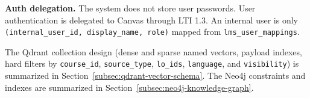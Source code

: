 \textbf{Auth delegation.} The system does not store user passwords. User
authentication is delegated to Canvas through LTI 1.3. An internal user is
only \texttt{(internal\_user\_id, display\_name, role)} mapped from
\texttt{lms\_user\_mappings}.

The Qdrant collection design (dense and sparse named vectors, payload
indexes, hard filters by \texttt{course\_id}, \texttt{source\_type},
\texttt{lo\_ids}, \texttt{language}, and \texttt{visibility}) is
summarized in Section~\ref{subsec:qdrant-vector-schema}. The Neo4j
constraints and indexes are summarized in
Section~\ref{subsec:neo4j-knowledge-graph}.
